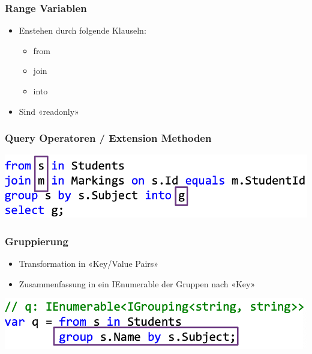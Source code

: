 \subsubsection{Range Variablen}
\begin{itemize}
    \item Enstehen durch folgende Klauseln:
    \begin{itemize}
        \item from
        \item join
        \item into
    \end{itemize}
    \item Sind «readonly»
\end{itemize}
\vspace{-8pt}
\subsubsection{Query Operatoren / Extension Methoden}
\begin{center}
    \includegraphics[scale=.3]{graphic/linq/Range Variablen.png}
\end{center}
\vspace{-8pt}

\subsubsection{Gruppierung}
\begin{itemize}
    \item Transformation in «Key/Value Pairs»
    \item Zusammenfassung in ein IEnumerable der Gruppen nach «Key»
\end{itemize}
\vspace{-8pt}
\begin{center}
    \includegraphics[scale=.3]{graphic/linq/Gruppierung.png}
\end{center}
\vspace{-8pt}

